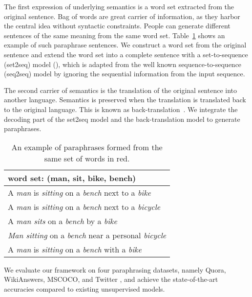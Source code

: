 The first expression of underlying semantics is a word set extracted 
from the original sentence. Bag of words are great carrier of information, 
as they harbor the central idea without syntactic constraints. 
People can generate different sentences of the same meaning from 
the same word set. Table~\ref{para-example} shows an example of such 
paraphrase sentences. We construct a word set from the 
original sentence and extend the word set into a complete sentence 
with a set-to-sequence (set2seq) model (), 
which is adapted from the well known sequence-to-sequence (seq2seq) model by ignoring the sequential information from the input sequence.

The second carrier of semantics is the translation of the 
original sentence into another language. 
Semantics is preserved when the translation is translated back to the 
original language. This is known as back-translation~\citep{wieting2017paranmt}. 
We integrate the decoding part of the set2seq model and 
the back-translation model to generate paraphrases.

\begin{table}[th]
\small
\centering
\begin{tabular}{l}
\hline 
word set: \textbf{(man, sit, bike, bench)} \\
\hline
A \textit{\color{red}man} is \textit{\color{red}sitting} on a \textit{\color{red}bench} next to a \textit{\color{red}bike} \\
A \textit{\color{red}man} is \textit{\color{red}sitting} on a \textit{\color{red}bench} next to a \textit{\color{red}bicycle} \\
A \textit{\color{red}man sits} on a \textit{\color{red}bench} by a \textit{\color{red}bike} \\
\textit{\color{red}Man sitting} on a \textit{\color{red}bench} near a personal \textit{\color{red}bicycle} \\
A \textit{\color{red}man} is \textit{\color{red}sitting} on a \textit{\color{red}bench} with a \textit{\color{red}bike} \\
\hline
\end{tabular}
\caption{\label{para-example} An example of paraphrases formed
from the same set of words in red.} 
\end{table}

We evaluate our framework on four paraphrasing datasets, namely Quora, WikiAnswers, MSCOCO, and Twitter \citep{lan2017continuously}, and achieve the state-of-the-art accuracies compared to existing unsupervised models. 

